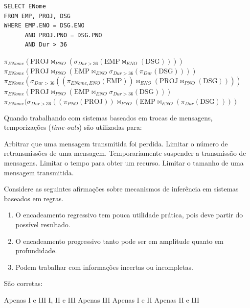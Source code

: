 \documentclass[12pt, addpoints]{exam}
\begin{document}
\begin{questions}
\begin{verbatim}
SELECT ENome
FROM EMP, PROJ, DSG
WHERE EMP.ENO = DSG.ENO
      AND PROJ.PNO = DSG.PNO
      AND Dur > 36
\end{verbatim}
\begin{choices}
\choice \( \pi_{ENome} (\text{PROJ} \Join_{PNO} (\sigma_{Dur > 36} (\text{EMP} \Join_{ENO} (\text{DSG})))) \)
\choice \( \pi_{ENome} (\text{PROJ} \Join_{PNO} (\text{EMP} \Join_{ENO} \sigma_{Dur > 36} (\pi_{Dur} (\text{DSG})))) \)
\choice \( \pi_{ENome} (\sigma_{Dur > 36} ((\pi_{ENome, ENO} (\text{EMP})) \Join_{ENO} (\text{PROJ} \Join_{PNO} (\text{DSG})))) \)
\choice \( \pi_{ENome} (\text{PROJ} \Join_{PNO} (\text{EMP} \Join_{ENO} \sigma_{Dur > 36} (\text{DSG}))) \)
\choice \( \pi_{ENome} (\sigma_{Dur > 36} ((\pi_{PNO} (\text{PROJ})) \Join_{PNO} (\text{EMP} \Join_{ENO} (\pi_{Dur} (\text{DSG})))) \)
\end{choices}

\question
Quando trabalhando com sistemas baseados em trocas de mensagens, temporizações (\textit{time-outs}) são utilizadas para:

\begin{choices}
\choice Arbitrar que uma mensagem transmitida foi perdida.
\choice Limitar o número de retransmissões de uma mensagem.
\choice Temporariamente suspender a transmissão de mensagens.
\choice Limitar o tempo para obter um recurso.
\choice Limitar o tamanho de uma mensagem transmitida.
\end{choices}

\question
Considere as seguintes afirmações sobre mecanismos de inferência em sistemas baseados em regras.
\begin{enumerate}[label=\Roman*.]
    \item O encadeamento regressivo tem pouca utilidade prática, pois deve partir do possível resultado.
    \item O encadeamento progressivo tanto pode ser em amplitude quanto em profundidade.
    \item Podem trabalhar com informações incertas ou incompletas. 
\end{enumerate}
São corretas:
\begin{choices}
\choice Apenas I e III
\choice I, II e III
\choice Apenas III
\choice Apenas I e II
\choice Apenas II e III
\end{choices}



    \end{questions}
    
\end{document}
